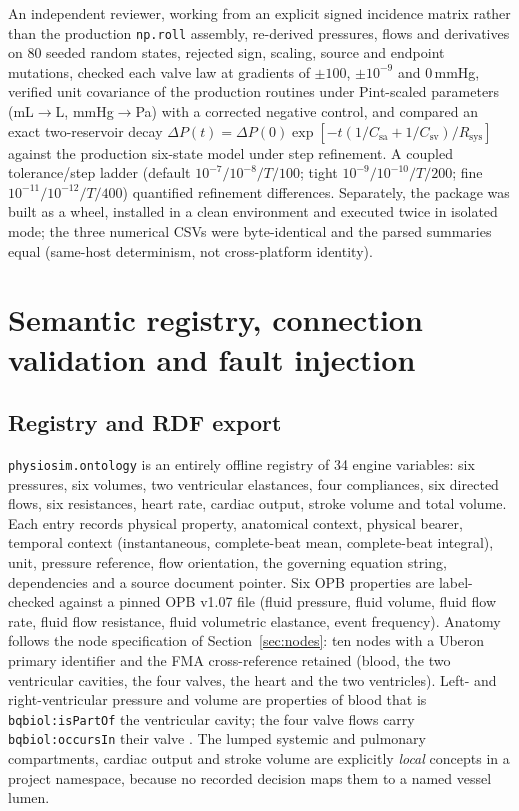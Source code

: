 \documentclass[11pt,letterpaper]{article}
\newcommand{\pkg}[1]{\texttt{#1}}
\begin{document}
An independent reviewer, working from an explicit signed incidence matrix rather than the production \pkg{np.roll} assembly, re-derived pressures, flows and derivatives on 80 seeded random states, rejected sign, scaling, source and endpoint mutations, checked each valve law at gradients of $\pm100$, $\pm10^{-9}$ and 0\,mmHg, verified unit covariance of the production routines under Pint-scaled parameters (mL$\to$L, mmHg$\to$Pa) with a corrected negative control, and compared an exact two-reservoir decay $\Delta P(t)=\Delta P(0)\exp[-t(1/C_{\mathrm{sa}}+1/C_{\mathrm{sv}})/R_{\mathrm{sys}}]$ against the production six-state model under step refinement. A coupled tolerance/step ladder (default $10^{-7}/10^{-8}/T{/}100$; tight $10^{-9}/10^{-10}/T{/}200$; fine $10^{-11}/10^{-12}/T{/}400$) quantified refinement differences. Separately, the package was built as a wheel, installed in a clean environment and executed twice in isolated mode; the three numerical CSVs were byte-identical and the parsed summaries equal (same-host determinism, not cross-platform identity).

\section{Semantic registry, connection validation and fault injection}
\label{sec:semantic}

\subsection{Registry and RDF export}

\pkg{physiosim.ontology} is an entirely offline registry of 34 engine variables: six pressures, six volumes, two ventricular elastances, four compliances, six directed flows, six resistances, heart rate, cardiac output, stroke volume and total volume. Each entry records physical property, anatomical context, physical bearer, temporal context (instantaneous, complete-beat mean, complete-beat integral), unit, pressure reference, flow orientation, the governing equation string, dependencies and a source document pointer. Six OPB properties are label-checked against a pinned OPB v1.07 file (fluid pressure, fluid volume, fluid flow rate, fluid flow resistance, fluid volumetric elastance, event frequency). Anatomy follows the node specification of Section~\ref{sec:nodes}: ten nodes with a Uberon primary identifier and the FMA cross-reference retained (blood, the two ventricular cavities, the four valves, the heart and the two ventricles). Left- and right-ventricular pressure and volume are properties of blood that is \pkg{bqbiol:isPartOf} the ventricular cavity; the four valve flows carry \pkg{bqbiol:occursIn} their valve \citep{courtot2011qualifiers}. The lumped systemic and pulmonary compartments, cardiac output and stroke volume are explicitly \emph{local} concepts in a project namespace, because no recorded decision maps them to a named vessel lumen.
\end{document}
